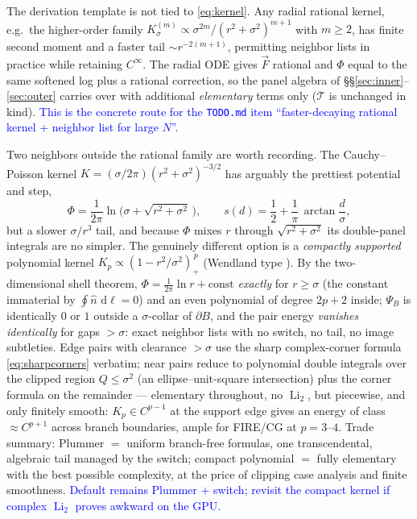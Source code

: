 \documentclass[11pt]{article}
\newcommand{\aside}[1]{\textcolor{blue}{#1}}
\newcommand{\Li}{\operatorname{Li}_2}
\newcommand{\atan}{\operatorname{arctan}}
\newcommand{\dd}{\,\mathrm{d}}
\begin{document}
The derivation template is not tied to \eqref{eq:kernel}.  Any radial rational
kernel, e.g.\ the higher-order family
$K^{(m)}_\sigma\propto\sigma^{2m}/(r^2+\sigma^2)^{m+1}$ with $m\ge2$, has finite
second moment and a faster tail $\sim r^{-2(m+1)}$, permitting neighbor lists in
practice while retaining $C^\infty$.  The radial ODE gives $\vec F$ rational and
$\Phi$ equal to the same softened log plus a rational correction, so the panel
algebra of \S\S\ref{sec:inner}--\ref{sec:outer} carries over with additional
\emph{elementary} terms only ($\mathcal T$ is unchanged in kind).  \aside{This is
the concrete route for the \texttt{TODO.md} item ``faster-decaying rational kernel +
neighbor list for large $N$''.}

Two neighbors outside the rational family are worth recording.  The
Cauchy--Poisson kernel $K=(\sigma/2\pi)(r^2+\sigma^2)^{-3/2}$ has arguably the
prettiest potential and step,
\begin{equation}
  \Phi=\frac{1}{2\pi}\ln\!\bigl(\sigma+\sqrt{r^2+\sigma^2}\,\bigr),
  \qquad
  s(d)=\frac12+\frac1\pi\,\atan\frac d\sigma ,
  \label{eq:cauchy}
\end{equation}
but a slower $\sigma/r^3$ tail, and because $\Phi$ mixes $r$ through
$\sqrt{r^2+\sigma^2}$ its double-panel integrals are no simpler.  The genuinely
different option is a \emph{compactly supported} polynomial kernel
$K_p\propto(1-r^2/\sigma^2)_+^{\,p}$ (Wendland type \cite{Wendland1995}).  By the
two-dimensional shell theorem, $\Phi=\tfrac1{2\pi}\ln r+\text{const}$ \emph{exactly}
for $r\ge\sigma$ (the constant immaterial by $\oint\hat n\,\dd\ell=0$) and an even
polynomial of degree $2p{+}2$ inside; $\Psi_B$ is identically $0$ or $1$ outside a
$\sigma$-collar of $\partial B$, and the pair energy \emph{vanishes identically}
for gaps $>\sigma$: exact neighbor lists with no switch, no tail, no image
subtleties.  Edge pairs with clearance $>\sigma$ use the sharp complex-corner
formula \eqref{eq:sharpcorners} verbatim; near pairs reduce to polynomial double
integrals over the clipped region $Q\le\sigma^2$ (an ellipse--unit-square
intersection) plus the corner formula on the remainder --- elementary throughout, no
$\Li$, but piecewise, and only finitely smooth: $K_p\in C^{p-1}$ at the support edge
gives an energy of class $\approx C^{p+1}$ across branch boundaries, ample for
FIRE/CG at $p=3$--$4$.  Trade summary: Plummer $=$ uniform branch-free formulas, one
transcendental, algebraic tail managed by the switch; compact polynomial $=$ fully
elementary with the best possible complexity, at the price of clipping case
analysis and finite smoothness.  \aside{Default remains Plummer $+$ switch; revisit
the compact kernel if complex $\Li$ proves awkward on the GPU.}
\end{document}
